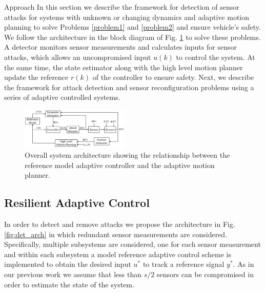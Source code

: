 
\begin{section}{Approach}
\label{sec:approach}
In this section we describe the framework for detection of sensor attacks for systems with unknown or changing dynamics and adaptive motion planning to solve Problems \ref{problem1} and \ref{problem2} and ensure vehicle's safety. We follow the architecture in the block diagram of Fig. \ref{fig:system_arch} to solve these problems. A detector monitors sensor measurements and calculates inputs for sensor attacks, which allows an uncompromised input $u(k)$ to control the system. At the same time, the state estimator along with the high level motion planner update the reference $r(k)$ of the controller to ensure safety. Next, we describe the framework for attack detection and sensor reconfiguration problems using a series of adaptive controlled systems.

\begin{figure}[ht!]
\vspace{1pt}
\centering
\includegraphics[width=0.46\textwidth]{sys_arch.png}
\caption{Overall system architecture showing the relationship between the reference model adaptive controller and the adaptive motion planner.}
\label{fig:system_arch}
\end{figure}

\subsection{Resilient Adaptive Control}
\label{sec:Res_adapt_control}


In order to detect and remove attacks we propose the architecture in Fig. \ref{fig:det_arch} in which redundant sensor measurements are considered. Specifically, multiple subsystems are considered, one for each sensor measurement and within each subsystem a model reference adaptive control scheme is implemented to obtain the desired input $u^*$ to track a reference signal $y^*$. As in our previous work \cite{6943080,6843720} we assume that less than $s/2$ sensors can be compromised in order to estimate the state of the system.




\end{section}
